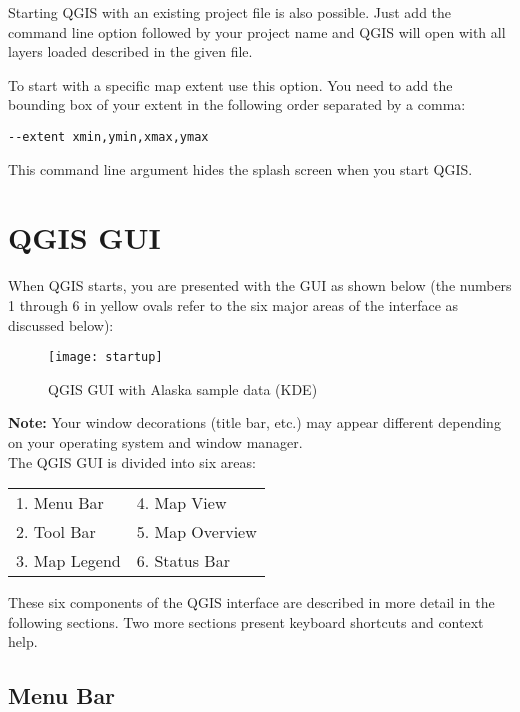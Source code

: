 Starting QGIS with an existing project file is also possible. Just
add the command line option  followed by your project
name and QGIS will open with all layers loaded described in the given file.

To start with a specific map extent use this option. You need to add the bounding box of your extent in the following order separated by a comma:
\begin{verbatim}
--extent xmin,ymin,xmax,ymax
\end{verbatim}

This command line argument hides the splash screen when you start QGIS.

\section{QGIS GUI}
\label{label_qgismainwindow}

When QGIS starts, you are presented with the GUI as shown below
(the numbers 1 through 6 in yellow ovals refer to the six major areas of the
interface as discussed below):

\begin{figure}[ht]
   \centering
    \texttt{[image: startup]}
    \caption{QGIS GUI with Alaska sample data \nixcaption (KDE)} \label{fig:startup}
\end{figure}

\textbf{Note:} Your window decorations (title bar, etc.) may appear
different depending on your operating system and window manager.\\

The QGIS GUI is divided into six areas:

\begin{tabular}{p{5cm} p{5cm}}
1. Menu Bar & 4. Map View \\
2. Tool Bar & 5. Map Overview \\
3. Map Legend & 6. Status Bar \\
\end{tabular}

These six components of the QGIS interface are described in more detail in
the following sections. Two more sections present keyboard shortcuts and
context help.


\subsection{Menu Bar}\label{label_menubar}

